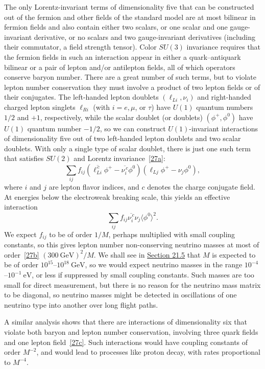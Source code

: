 The only Lorentz-invariant terms of dimensionality five that can be constructed out of the fermion and other fields of the standard model are at most bilinear in fermion fields and also contain either two scalars, or one scalar and one gauge-invariant derivative, or no scalars and two gauge-invariant derivatives (including their commutator, a field strength tensor). Color $SU(3)$ invariance requires that the fermion fields in such an interaction appear in either a quark--antiquark bilinear or a pair of lepton and/or antilepton fields, all of which operators conserve baryon number. There are a great number of such terms, but to violate lepton number conservation they must involve a product of two lepton fields or of their conjugates. The left-handed lepton doublets $(\ell_{Li},\nu_i)$ and right-handed charged lepton singlets $\ell_{Ri}$ (with $i=e,\mu$, or $\tau$) have $U(1)$ quantum numbers $1/2$ and $+1$, respectively, while the scalar doublet (or doublets) $(\phi^+,\phi^0)$ have $U(1)$ quantum number $-1/2$, so we can construct $U(1)$-invariant interactions of dimensionality five out of two left-handed lepton doublets and two scalar doublets. With only a single type of scalar doublet, there is just one such term that satisfies $SU(2)$ and Lorentz invariance~\hyperref[ch21-ref-27a]{[27a]}:
\begin{equation}
\sum_{ij}f_{ij}
\left(\overline{\ell_{Li}^{\,c}}\phi^+
-\overline{\nu_i^{\,c}}\phi^0\right)
\left(\ell_{Lj}\phi^+-\nu_j\phi^0\right),
\tag{21.3.54}\label{eq:21.3.54}
\end{equation}
where $i$ and $j$ are lepton flavor indices, and $c$ denotes the charge conjugate field. At energies below the electroweak breaking scale, this yields an effective interaction
\begin{equation}
\sum_{ij}f_{ij}\overline{\nu_i^{\,c}}\nu_j
\langle\phi^0\rangle^2.
\tag{21.3.55}\label{eq:21.3.55}
\end{equation}
We expect $f_{ij}$ to be of order $1/M$, perhaps multiplied with small coupling constants, so this gives lepton number non-conserving neutrino masses at most of order~\hyperref[ch21-ref-27b]{[27b]} $(300\ \mathrm{GeV})^2/M$. We shall see in \hyperref[sec:21.5]{Section 21.5} that $M$ is expected to be of order $10^{15}$--$10^{18}\ \mathrm{GeV}$, so we would expect neutrino masses in the range $10^{-4}$--$10^{-1}\ \mathrm{eV}$, or less if suppressed by small coupling constants. Such masses are too small for direct measurement, but there is no reason for the neutrino mass matrix to be diagonal, so neutrino masses might be detected in oscillations of one neutrino type into another over long flight paths.

A similar analysis shows that there are interactions of dimensionality six that violate both baryon and lepton number conservation, involving three quark fields and one lepton field~\hyperref[ch21-ref-27c]{[27c]}. Such interactions would have coupling constants of order $M^{-2}$, and would lead to processes like proton decay, with rates proportional to $M^{-4}$.

